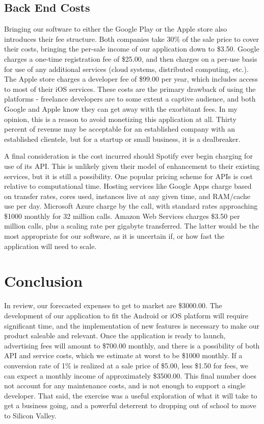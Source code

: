 \documentclass{roffin}
\begin{document}
\subsection{Back End Costs}
Bringing our software to either the Google Play or the Apple store also introduces their fee structure.  Both companies take 30\% of the sale price to cover their costs, bringing the per-sale income of our application down to \$3.50.  Google charges a one-time registration fee of \$25.00, and then charges on a per-use basis for use of any additional services (cloud systems, distributed computing, etc.).  The Apple store charges a developer fee of \$99.00 per year, which includes access to most of their iOS services.  These costs are the primary drawback of using the platforms - freelance developers are to some extent a captive audience, and both Google and Apple know they can get away with the exorbitant fees.  In my opinion, this is a reason to avoid monetizing this application at all.  Thirty percent of revenue may be acceptable for an established company with an established clientele, but for a startup or small business, it is a dealbreaker.

A final consideration is the cost incurred should Spotify ever begin charging for use of its API.  This is unlikely given their model of enhancement to their existing services, but it is still a possibility.  One popular pricing scheme for APIs is cost relative to computational time.  Hosting services like Google Apps charge based on transfer rates, cores used, instances live at any given time, and RAM/cache use per day.  Microsoft Azure charge by the call, with standard rates approaching \$1000 monthly for 32 million calls.  Amazon Web Services charges \$3.50 per million calls, plus a scaling rate per gigabyte transferred.  The latter would be the most appropriate for our software, as it is uncertain if, or how fast the application will need to scale.


\section{Conclusion}
In review, our forecasted expenses to get to market are \$3000.00.  The development of our application to fit the Android or iOS platform will require significant time, and the implementation of new features is necessary to make our product saleable and relevant.  Once the application is ready to launch, advertising fees will amount to \$700.00 monthly, and there is a possibility of both API and service costs, which we estimate at worst to be \$1000 monthly.  If a conversion rate of 1\% is realized at a sale price of \$5.00, less \$1.50 for fees, we can expect a monthly income of approximately \$3500.00.  This final number does not account for any maintenance costs, and is not enough to support a single developer.  That said, the exercise was a useful exploration of what it will take to get a business going, and a powerful deterrent to dropping out of school to move to Silicon Valley.
\end{document}
